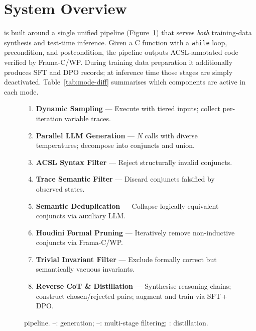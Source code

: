 \section{System Overview}\label{sec:overview}

\sam{} is built around a single unified pipeline
(Figure~\ref{fig:pipeline}) that serves \emph{both} training-data
synthesis and test-time inference.
Given a C function with a \texttt{while} loop, precondition, and
postcondition, the pipeline outputs ACSL-annotated code verified by
Frama-C/WP.
During training data preparation it additionally produces SFT and DPO
records; at inference time those stages are simply deactivated.
Table~\ref{tab:mode-diff} summarises which components are active in
each mode.

\begin{figure}[t]
\centering
\begin{stepbox}
\begin{enumerate}[leftmargin=1.5em,itemsep=2pt,label={\small\ding{\numexpr181+\value{enumi}\relax}}]
\item \textbf{Dynamic Sampling} --- Execute with tiered
      inputs; collect per-iteration variable traces.
\item \textbf{Parallel LLM Generation} --- $N$ calls with
      diverse temperatures; decompose into conjuncts and union.
\item \textbf{ACSL Syntax Filter} --- Reject
      structurally invalid conjuncts.
\item \textbf{Trace Semantic Filter} --- Discard
      conjuncts falsified by observed states.
\item \textbf{Semantic Deduplication} --- Collapse
      logically equivalent conjuncts via auxiliary LLM.
\item \textbf{Houdini Formal Pruning} --- Iteratively
      remove non-inductive conjuncts via Frama-C/WP.
\item \textbf{Trivial Invariant Filter} --- Exclude
      formally correct but semantically vacuous invariants.
\item \textbf{Reverse CoT \& Distillation} ---
      Synthesise reasoning chains; construct chosen/rejected pairs;
      augment and train via SFT\,+\,DPO.
\end{enumerate}
\end{stepbox}
\caption{\sam{} pipeline.
--: generation;
--: multi-stage filtering;
: distillation.}
\label{fig:pipeline}
\end{figure}

